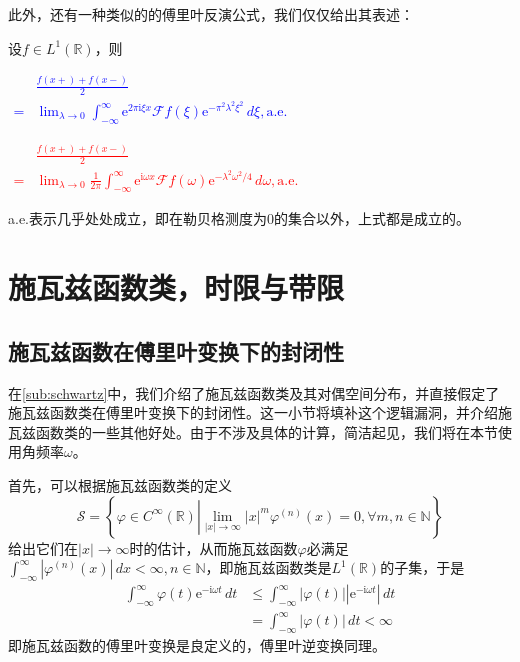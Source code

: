 \documentclass{ctexbook}
\newcommand{\lr}[2]{%
    \begin{center}
    \begin{minipage}[t]{0.45\textwidth}
        \centering
        \allowdisplaybreaks
        \textcolor{blue}{%
            \begin{varwidth}{\linewidth}
            $\begin{aligned}
            #1
            \end{aligned}$
            \end{varwidth}
        }
    \end{minipage}
    \hfill
    \begin{minipage}[t]{0.45\textwidth}
        \centering
        \allowdisplaybreaks
        \textcolor{red}{%
            \begin{varwidth}{\linewidth}
            $\begin{aligned}
            #2
            \end{aligned}$
            \end{varwidth}
        }
    \end{minipage}
\end{center}
}
\begin{document}
此外，还有一种类似的的傅里叶反演公式，我们仅仅给出其表述\cite{folland}：
\begin{theorem}[傅里叶反演公式]
    设$f\in L^1(\mathbb{R})$，则
    \lr{
        &\frac{f(x+)+f(x-)}{2}\\
        =&\lim_{\lambda\to 0}\int_{-\infty}^{\infty}\mathrm{e}^{2\pi \mathrm{i}\xi x}\mathcal{F} f(\xi)\mathrm{e}^{-\pi^2 \lambda^2 \xi^2}\,d\xi,\text{a.e.}
    }{
        &\frac{f(x+)+f(x-)}{2}\\
        =&\lim_{\lambda\to 0}\frac{1}{2\pi}\int_{-\infty}^{\infty}\mathrm{e}^{\mathrm{i}\omega x}\mathcal{F} f(\omega)\mathrm{e}^{-\lambda^2\omega^2/4}\,d\omega,\text{a.e.}
    }
    a.e.表示几乎处处成立，即在勒贝格测度为0的集合以外，上式都是成立的。
\end{theorem}

\section{施瓦兹函数类，时限与带限}\label{sec:Schwartz_Functions}

\subsection{施瓦兹函数在傅里叶变换下的封闭性}\label{sub:fourier_close}
在\ref{sub:schwartz}中，我们介绍了施瓦兹函数类及其对偶空间分布，并直接假定了施瓦兹函数类在傅里叶变换下的封闭性。这一小节将填补这个逻辑漏洞，并介绍施瓦兹函数类的一些其他好处。由于不涉及具体的计算，简洁起见，我们将在本节使用角频率$\omega$。

首先，可以根据施瓦兹函数类的定义\[\mathcal{S} =\left\{\varphi\in C^{\infty}(\mathbb{R} )\left|\lim_{|x|\to\infty}|x|^m\varphi^{(n)}(x)=0,\forall m,n\in\mathbb{N} \right.\right\}\]给出它们在$|x|\to\infty$时的估计，从而施瓦兹函数$\varphi$必满足$\int_{-\infty}^{\infty}|\varphi^{(n)}(x)|\,dx<\infty,n\in\mathbb{N}$，即施瓦兹函数类是$L^1(\mathbb{R} )$的子集，于是\begin{align*}
    \int_{-\infty}^{\infty}\varphi(t)\mathrm{e}^{-\mathrm{i}\omega t}\,dt&\leq \int_{-\infty}^{\infty}|\varphi(t)||\mathrm{e}^{-\mathrm{i}\omega t}|\,dt\\
    &=\int_{-\infty}^{\infty}|\varphi(t)|\,dt<\infty
\end{align*}
即施瓦兹函数的傅里叶变换是良定义的，傅里叶逆变换同理。
\end{document}
